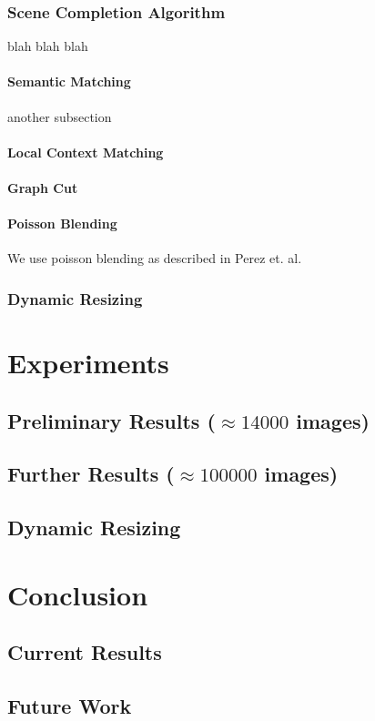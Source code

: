 \documentclass[11pt]{amsart}
\begin{document}
\subsubsection{Scene Completion Algorithm}
blah blah blah

\paragraph{\sc Semantic Matching} 
another subsection

\paragraph{\sc Local Context Matching}

\paragraph{\sc Graph Cut}

\paragraph{\sc Poisson Blending}
We use poisson blending as described in Perez et. al. 

\subsubsection{Dynamic Resizing}

\section{Experiments}

\subsection{Preliminary Results ($\approx14000$ images)}

\subsection{Further Results ($\approx100000$ images)} 

\subsection{Dynamic Resizing}

\section{Conclusion}

\subsection{Current Results}

\subsection{Future Work}



\end{document}
